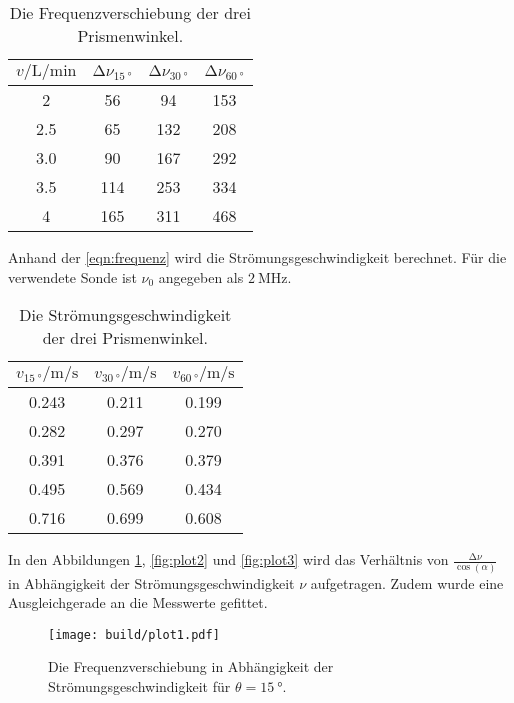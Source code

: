 \begin{table}[H]
    \centering
    \caption{Die Frequenzverschiebung der drei Prismenwinkel.}
    \label{tab:messwerte1}
\begin{tabular}{c c c c}
    \toprule
     $v / \si{\liter\per\minute}$ & $ \increment \nu_{\qty{15}{°}}$ & $\increment \nu_{\qty{30}{°}}$ & $\increment \nu_{\qty{60}{°}}$ \\
    \midrule
       2 &  56 &  94 & 153 \\
     2.5 &  65 & 132 & 208 \\
     3.0 &  90 & 167 & 292 \\
     3.5 & 114 & 253 & 334 \\
       4 & 165 & 311 & 468 \\
    \bottomrule
\end{tabular}
\end{table}

Anhand der \autoref{eqn:frequenz} wird die Strömungsgeschwindigkeit berechnet. Für die verwendete Sonde ist 
$\nu_0$ angegeben als $\SI{2}{\mega\hertz}$.

\begin{table}[H]
    \centering
    \caption{Die Strömungsgeschwindigkeit der drei Prismenwinkel.}
    \label{tab:geschw}
\begin{tabular}{c c c}
    \toprule
     $v_{\qty{15}{°}} / \si{\meter \per \second}$ &  $v_{\qty{30}{°}} / \si{\meter \per \second}$ &  $v_{\qty{60}{°}} / \si{\meter \per \second}$ \\
    \midrule
       0.243 &    0.211 &    0.199 \\
       0.282 &    0.297 &    0.270 \\
       0.391 &    0.376 &    0.379 \\
       0.495 &    0.569 &    0.434 \\
       0.716 &    0.699 &    0.608 \\
    \bottomrule
    \end{tabular}
\end{table}

In den Abbildungen \ref{fig:plot1}, \ref{fig:plot2} und \ref{fig:plot3} wird das Verhältnis von $\frac{\increment \nu}{\cos (\alpha)}$ in Abhängigkeit der Strömungsgeschwindigkeit
$\nu$ aufgetragen. Zudem wurde eine Ausgleichgerade an die Messwerte gefittet.

\begin{figure}[H]
	\texttt{[image: build/plot1.pdf]}
	\captionsetup{width=0.765\linewidth}
	\caption{Die Frequenzverschiebung in Abhängigkeit der Strömungsgeschwindigkeit für $\theta = \qty{15}{°}$.}
	\label{fig:plot1}
\end{figure}


